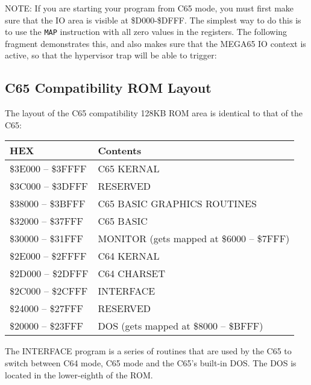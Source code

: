 NOTE: If you are starting your program from C65 mode, you must first make
sure that the IO area is visible at \$D000-\$DFFF.  The simplest way to do
this is to use the {\tt MAP} instruction with all zero values in the registers.
The following fragment demonstrates this, and also makes sure that the MEGA65 IO
context is active, so that the hypervisor trap will be able to trigger:



\subsection{C65 Compatibility ROM Layout}

The layout of the C65 compatibility 128KB ROM area is identical to that of the C65:

{\ttfamily
\setlength{\tabcolsep}{3pt}
\begin{tabular}{|l|l|}
\hline
{\bf{HEX}} & {\bf{Contents}} \\
\hline
\$3E000 -- \$3FFFF & C65 KERNAL \\
\hline
\$3C000 -- \$3DFFF & RESERVED \\
\hline
\$38000 -- \$3BFFF & C65 BASIC GRAPHICS ROUTINES \\
\hline
\$32000 -- \$37FFF & C65 BASIC \\
\hline
\$30000 -- \$31FFF & MONITOR (gets mapped at \$6000 -- \$7FFF) \\
\hline
\$2E000 -- \$2FFFF & C64 KERNAL \\
\hline
\$2D000 -- \$2DFFF & C64 CHARSET \\
\hline
\$2C000 -- \$2CFFF & INTERFACE \\
\hline
\$24000 -- \$27FFF & RESERVED \\
\hline
\$20000 -- \$23FFF & DOS (gets mapped at \$8000 -- \$BFFF) \\
\hline
\end{tabular}
}

The INTERFACE program is a series of routines that are used by the C65
to switch between C64 mode, C65 mode and the C65's built-in DOS.  The
DOS is located in the lower-eighth of the ROM.




